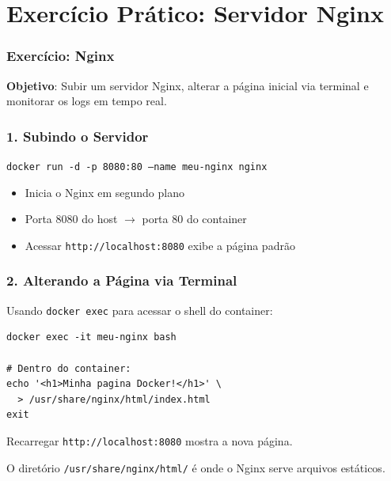 \section{Exercício Prático: Servidor Nginx}

\begin{frame}
  \frametitle{Exercício: Nginx}
  \textbf{Objetivo}: Subir um servidor Nginx, alterar a página inicial via terminal
  e monitorar os logs em tempo real.
\end{frame}

\begin{frame}
  \frametitle{1. Subindo o Servidor}
  \texttt{docker run -d -p 8080:80 --name meu-nginx nginx}

  \vspace{0.8em}
  \begin{itemize}
    \item Inicia o Nginx em segundo plano
    \item Porta 8080 do host $\rightarrow$ porta 80 do container
    \item Acessar \texttt{http://localhost:8080} exibe a página padrão
  \end{itemize}
\end{frame}

\begin{frame}[fragile]
  \frametitle{2. Alterando a Página via Terminal}
  Usando \texttt{docker exec} para acessar o shell do container:

  \vspace{0.5em}
\begin{verbatim}
docker exec -it meu-nginx bash

# Dentro do container:
echo '<h1>Minha pagina Docker!</h1>' \
  > /usr/share/nginx/html/index.html
exit
\end{verbatim}

  \vspace{0.5em}
  Recarregar \texttt{http://localhost:8080} mostra a nova página.

  \vspace{0.3em}
  \small O diretório \texttt{/usr/share/nginx/html/} é onde o Nginx serve arquivos estáticos.
\end{frame}

